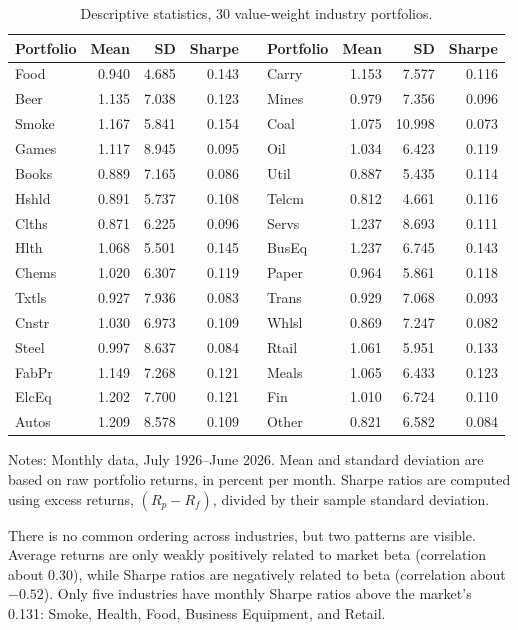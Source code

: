 \documentclass[11pt]{article}
\begin{document}
\begin{table}[H]
\centering
\caption{Descriptive statistics, 30 value-weight industry portfolios.}
\footnotesize
\setlength{\tabcolsep}{4pt}
\begin{tabular}{lrrrclrrr}
\toprule
Portfolio & Mean & SD & Sharpe && Portfolio & Mean & SD & Sharpe \\
\midrule
Food & 0.940 & 4.685 & 0.143 && Carry & 1.153 & 7.577 & 0.116 \\
Beer & 1.135 & 7.038 & 0.123 && Mines & 0.979 & 7.356 & 0.096 \\
Smoke & 1.167 & 5.841 & 0.154 && Coal & 1.075 & 10.998 & 0.073 \\
Games & 1.117 & 8.945 & 0.095 && Oil & 1.034 & 6.423 & 0.119 \\
Books & 0.889 & 7.165 & 0.086 && Util & 0.887 & 5.435 & 0.114 \\
Hshld & 0.891 & 5.737 & 0.108 && Telcm & 0.812 & 4.661 & 0.116 \\
Clths & 0.871 & 6.225 & 0.096 && Servs & 1.237 & 8.693 & 0.111 \\
Hlth & 1.068 & 5.501 & 0.145 && BusEq & 1.237 & 6.745 & 0.143 \\
Chems & 1.020 & 6.307 & 0.119 && Paper & 0.964 & 5.861 & 0.118 \\
Txtls & 0.927 & 7.936 & 0.083 && Trans & 0.929 & 7.068 & 0.093 \\
Cnstr & 1.030 & 6.973 & 0.109 && Whlsl & 0.869 & 7.247 & 0.082 \\
Steel & 0.997 & 8.637 & 0.084 && Rtail & 1.061 & 5.951 & 0.133 \\
FabPr & 1.149 & 7.268 & 0.121 && Meals & 1.065 & 6.433 & 0.123 \\
ElcEq & 1.202 & 7.700 & 0.121 && Fin & 1.010 & 6.724 & 0.110 \\
Autos & 1.209 & 8.578 & 0.109 && Other & 0.821 & 6.582 & 0.084 \\
\bottomrule
\end{tabular}
\label{tab:p1a}
\vspace{2pt}\begin{minipage}{0.93\textwidth}\footnotesize
Notes: Monthly data, July 1926--June 2026. Mean and standard deviation are
based on raw portfolio returns, in percent per month. Sharpe ratios are
computed using excess returns, $(R_p-R_f)$, divided by their sample standard
deviation.
\end{minipage}
\end{table}

There is no common ordering across industries, but two patterns are visible.
Average returns are only weakly positively related to market beta
(correlation about 0.30), while Sharpe ratios are negatively related to beta
(correlation about $-0.52$). Only five industries have monthly Sharpe ratios
above the market's 0.131: Smoke, Health, Food, Business Equipment, and
Retail.
\end{document}
